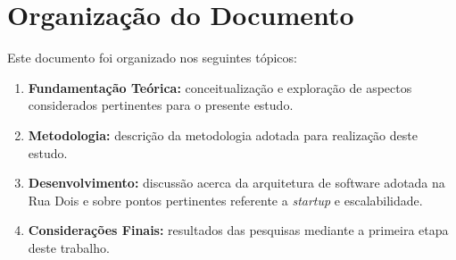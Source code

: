 \section{Organização do Documento}

Este documento foi organizado nos seguintes tópicos:

  \begin{enumerate}
    \item \textbf{Fundamentação Teórica:} conceitualização e exploração de
    aspectos considerados pertinentes para o presente estudo.
    \item \textbf{Metodologia:} descrição da metodologia adotada para
    realização deste estudo.
    \item \textbf{Desenvolvimento:} discussão acerca da arquitetura de
    software adotada na Rua Dois e sobre pontos pertinentes referente a
    \textit{startup} e escalabilidade.
    \item \textbf{Considerações Finais:} resultados das pesquisas mediante a
    primeira etapa deste trabalho.
  \end{enumerate}

